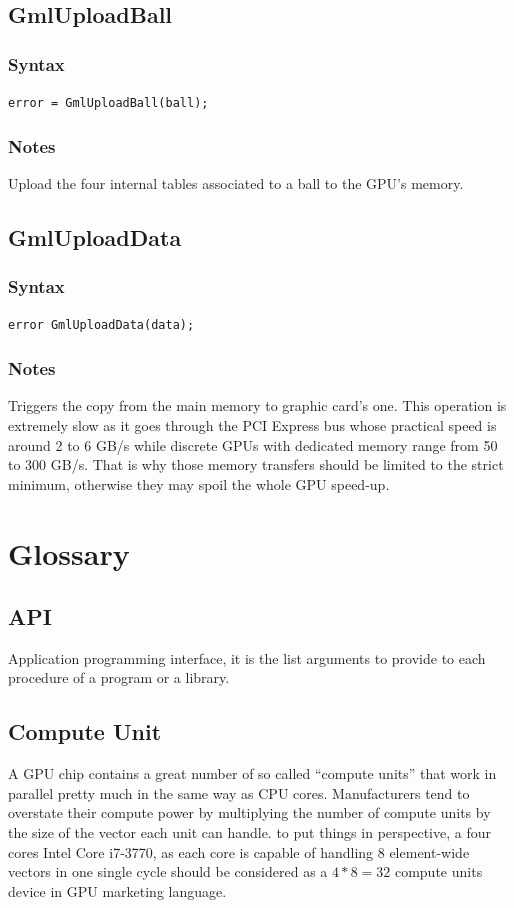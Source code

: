 \documentclass[a4paper,12pt]{article}
\begin{document}
\subsection{GmlUploadBall}
\subsubsection*{Syntax}
{\tt error = GmlUploadBall(ball);}
\subsubsection*{Notes}
Upload the four internal tables associated to a ball to the GPU's memory.


\subsection{GmlUploadData}
\subsubsection*{Syntax}
{\tt error GmlUploadData(data);}
\subsubsection*{Notes}
Triggers the copy from the main memory to graphic card's one. This operation is extremely slow as it goes through the PCI Express bus whose practical speed is around 2 to 6 GB/s while discrete GPUs with dedicated memory range from 50 to 300 GB/s. That is why those memory transfers should be limited to the strict minimum, otherwise they may spoil the whole GPU speed-up.


%
%


\section{Glossary}

\subsection{API}
Application programming interface, it is the list arguments to provide to each procedure of a program or a library.

\subsection{Compute Unit}
A GPU chip contains a great number of so called ``compute units'' that work in parallel pretty much in the same way as CPU  cores. Manufacturers tend to overstate their compute power by multiplying the number of compute units by the size of the vector each unit can handle. to put things in perspective, a four cores Intel Core i7-3770, as each core is capable of handling 8 element-wide vectors in one single cycle should be considered as a $4*8 = 32$ compute units device in GPU marketing language.
\end{document}
